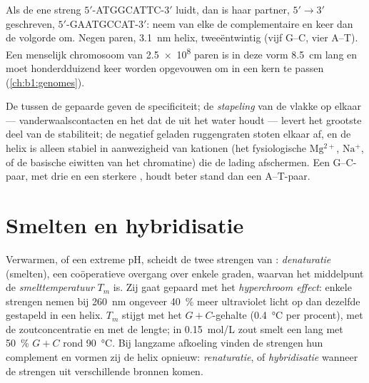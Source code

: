 \begin{example}\label{ex:b1:nucleic-acids:complement}
Als de ene streng $5'$-ATGGCATTC-$3'$ luidt, dan is haar partner, $5' \to 3'$
geschreven, $5'$-GAATGCCAT-$3'$: neem van elke  de complementaire en keer dan
de volgorde om. Negen paren, \qty{3.1}{nm} helix, tweeëntwintig 
(vijf G--C, vier A--T). Een menselijk chromosoom van \num{2.5e8} paren is in deze
vorm \qty{8.5}{cm} lang en moet honderdduizend keer worden opgevouwen om in een
kern te passen (\cref{ch:b1:genomes}).
\end{example}

\begin{proposition}\label{prop:b1:nucleic-acids:stability}
De  tussen de gepaarde  geven de specificiteit; de
\emph{stapeling} van de vlakke  op elkaar ---
vanderwaalscontacten en het  dat de  uit het water houdt ---
levert het grootste deel van de stabiliteit; de negatief geladen ruggengraten
stoten elkaar af, en de helix is alleen stabiel in aanwezigheid van kationen (het
fysiologische $\mathrm{Mg^{2+}}$, $\mathrm{Na^+}$, of de basische eiwitten van het
chromatine) die de lading afschermen. Een G--C-paar, met drie  en
een sterkere , houdt beter stand dan een A--T-paar.
\end{proposition}

\section{Smelten en hybridisatie}

\begin{definition}\label{def:b1:nucleic-acids:melting}
Verwarmen, of een extreme pH, scheidt de twee strengen van :
\emph{denaturatie} (smelten), een coöperatieve overgang
over enkele graden, waarvan het middelpunt de
\emph{smelttemperatuur} $T_m$ is. Zij gaat gepaard met het
\emph{hyperchroom effect}: enkele strengen nemen bij \qty{260}{nm} ongeveer
\qty{40}{\%} meer ultraviolet licht op dan dezelfde  gestapeld in een helix.
$T_m$ stijgt met het $G + C$-gehalte (\qty{0.4}{\celsius} per procent), met de
zoutconcentratie en met de lengte; in \qty{0.15}{mol/L} zout smelt een lang 
met \qty{50}{\%} $G + C$ rond \qty{90}{\celsius}. Bij langzame afkoeling vinden de
strengen hun complement en vormen zij de helix opnieuw: \emph{renaturatie}, of
\emph{hybridisatie} wanneer de strengen uit verschillende
bronnen komen.
\end{definition}

